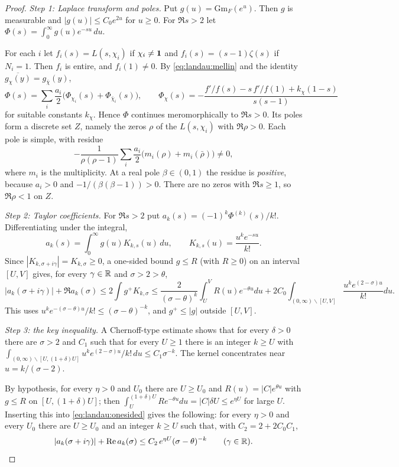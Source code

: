 \begin{proof}
\emph{Step 1: Laplace transform and poles.} Put $g(u)=\mathrm{Gm}_F(e^u)$. Then $g$ is measurable and
$|g(u)|\le C_0e^{2u}$ for $u\ge0$. For $\Re s>2$ let $\Phi(s)=\int_0^\infty g(u)e^{-su}\,du$.

For each $i$ let $f_i(s)=L(s,\chi_i)$ if $\chi_i\ne\mathbf{1}$ and $f_i(s)=(s-1)\zeta(s)$ if $N_i=1$. Then
$f_i$ is entire, and $f_i(1)\ne0$. By \eqref{eq:landau:mellin} and the identity
$\overline{g_\chi(y)}=g_{\bar\chi}(y)$,
\[
\Phi(s)=\sum_i\frac{a_i}2\big(\Phi_{\chi_i}(s)+\Phi_{\bar\chi_i}(s)\big),\qquad
\Phi_\chi(s)=-\frac{f'/f(s)-s\,f'/f(1)+k_\chi(1-s)}{s(s-1)}
\]
for suitable constants $k_\chi$. Hence $\Phi$ continues meromorphically to $\Re s>0$. Its poles form a
discrete set $Z$, namely the zeros $\rho$ of the $L(s,\chi_i)$ with $\Re\rho>0$. Each pole is simple, with
residue
\[
-\frac1{\rho(\rho-1)}\sum_i\frac{a_i}2\big(m_i(\rho)+m_i(\bar\rho)\big)\neq0,
\]
where $m_i$ is the multiplicity. At a real pole $\beta\in(0,1)$ the residue is \emph{positive}, because
$a_i>0$ and $-1/(\beta(\beta-1))>0$. There are no zeros with $\Re s\ge1$, so $\Re\rho<1$ on $Z$.

\emph{Step 2: Taylor coefficients.} For $\Re s>2$ put $a_k(s)=(-1)^k\Phi^{(k)}(s)/k!$. Differentiating
under the integral,
\[
a_k(s)=\int_0^\infty g(u)K_{k,s}(u)\,du,\qquad K_{k,s}(u)=\frac{u^ke^{-su}}{k!}.
\]
Since $|K_{k,\sigma+i\gamma}|=K_{k,\sigma}\ge0$, a one-sided bound $g\le R$ (with $R\ge0$) on an interval
$[U,V]$ gives, for every $\gamma\in\mathbb{R}$ and $\sigma>2>\theta$,
\begin{equation}\label{eq:landau:onesided}
|a_k(\sigma+i\gamma)|+\Re a_k(\sigma)\le2\int g^+K_{k,\sigma}
\le\frac{2}{(\sigma-\theta)^k}\int_U^VR(u)e^{-\theta u}du+2C_0\!\int_{(0,\infty)\smallsetminus[U,V]}\!\frac{u^ke^{(2-\sigma)u}}{k!}du.
\end{equation}
This uses $u^ke^{-(\sigma-\theta)u}/k!\le(\sigma-\theta)^{-k}$, and $g^+\le|g|$ outside $[U,V]$.

\emph{Step 3: the key inequality.} A Chernoff-type estimate shows that for every $\delta>0$ there are
$\sigma>2$ and $C_1$ such that for every $U\ge1$ there is an integer $k\ge U$ with
$\int_{(0,\infty)\smallsetminus[U,(1+\delta)U]}u^ke^{(2-\sigma)u}/k!\,du\le C_1\sigma^{-k}$. The kernel
concentrates near $u=k/(\sigma-2)$.

By hypothesis, for every $\eta>0$ and $U_0$ there are $U\ge U_0$ and $R(u)=|C|e^{\theta u}$ with $g\le R$
on $[U,(1+\delta)U]$; then $\int_U^{(1+\delta)U}Re^{-\theta u}du=|C|\delta U\le e^{\eta U}$ for large $U$.
Inserting this into \eqref{eq:landau:onesided} gives the following: for every $\eta>0$ and every $U_0$
there are $U\ge U_0$ and an integer $k\ge U$ such that, with $C_2=2+2C_0C_1$,
\begin{equation}\label{eq:landau:key}
|a_k(\sigma+i\gamma)|+\operatorname{Re} a_k(\sigma)\le C_2\,e^{\eta U}(\sigma-\theta)^{-k}\qquad(\gamma\in\mathbb{R}).
\end{equation}


\end{proof}

